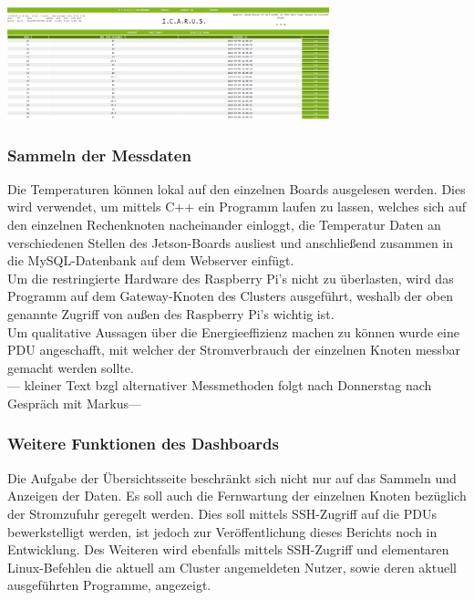 \begin{minipage}{\textwidth}

\begin{center}
	\includegraphics[width=0.7\textwidth]{./Bilder/Dashboard/Dashboard_frontend.png}
	\label{fig:dashboardpic}

\end{center}	
\end{minipage}

\subsubsection{Sammeln der Messdaten}
Die Temperaturen können lokal auf den einzelnen Boards ausgelesen werden. Dies wird verwendet, um mittels C++ ein Programm laufen zu lassen, welches sich auf den einzelnen Rechenknoten nacheinander einloggt, die Temperatur Daten an verschiedenen Stellen des Jetson-Boards ausliest und anschließend zusammen in die MySQL-Datenbank auf dem Webserver einfügt.\\
Um die restringierte Hardware des Raspberry Pi's nicht zu überlasten, wird das Programm auf dem Gateway-Knoten des Clusters ausgeführt, weshalb der oben genannte Zugriff von außen des Raspberry Pi's wichtig ist. \\
Um qualitative Aussagen über die Energieeffizienz machen zu können wurde eine PDU angeschafft, mit welcher der Stromverbrauch der einzelnen Knoten messbar gemacht werden sollte. \\
--- kleiner Text bzgl alternativer Messmethoden folgt nach Donnerstag nach Gespräch mit Markus---\\

\subsubsection{Weitere Funktionen des Dashboards}
Die Aufgabe der Übersichtsseite beschränkt sich nicht nur auf das Sammeln und Anzeigen der Daten. Es soll auch die Fernwartung der einzelnen Knoten bezüglich der Stromzufuhr geregelt werden. Dies soll mittels SSH-Zugriff auf die PDUs bewerkstelligt werden, ist jedoch zur Veröffentlichung dieses Berichts noch in Entwicklung.
Des Weiteren wird ebenfalls mittels SSH-Zugriff und elementaren Linux-Befehlen die aktuell am Cluster angemeldeten Nutzer, sowie deren aktuell ausgeführten Programme, angezeigt.
